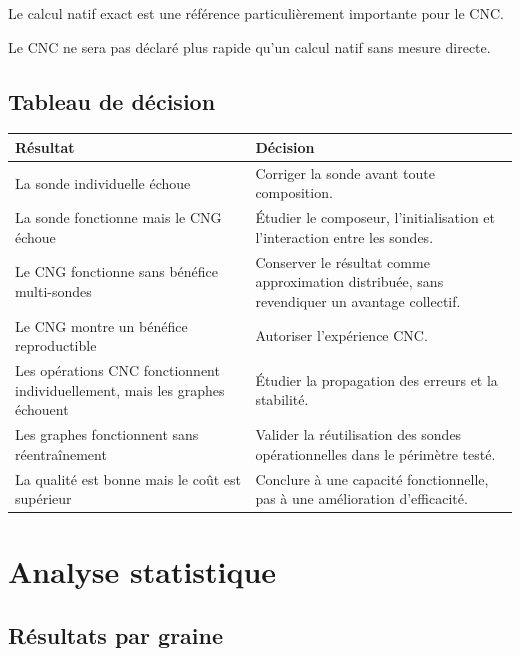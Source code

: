 \documentclass[11pt,a4paper]{article}
\begin{document}
Le calcul natif exact est une référence particulièrement
importante pour le CNC.

Le CNC ne sera pas déclaré plus rapide qu'un calcul natif
sans mesure directe.

\subsection{Tableau de décision}

\begin{tabularx}{\textwidth}{
    >{\RaggedRight\arraybackslash}p{}
    X
}
\toprule
\textbf{Résultat} & \textbf{Décision} \\
\midrule
La sonde individuelle échoue
& Corriger la sonde avant toute composition. \\

La sonde fonctionne mais le CNG échoue
& Étudier le composeur, l'initialisation et l'interaction
entre les sondes. \\

Le CNG fonctionne sans bénéfice multi-sondes
& Conserver le résultat comme approximation distribuée,
sans revendiquer un avantage collectif. \\

Le CNG montre un bénéfice reproductible
& Autoriser l'expérience CNC. \\

Les opérations CNC fonctionnent individuellement,
mais les graphes échouent
& Étudier la propagation des erreurs et la stabilité. \\

Les graphes fonctionnent sans réentraînement
& Valider la réutilisation des sondes opérationnelles
dans le périmètre testé. \\

La qualité est bonne mais le coût est supérieur
& Conclure à une capacité fonctionnelle, pas à une
amélioration d'efficacité. \\
\bottomrule
\end{tabularx}

\section{Analyse statistique}

\subsection{Résultats par graine}
\end{document}
